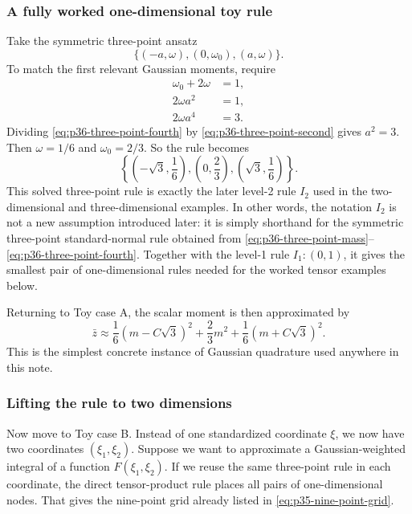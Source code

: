 \documentclass[11pt]{article}
\numberwithin{equation}{section}
\begin{document}
\subsubsection{A fully worked one-dimensional toy rule}

Take the symmetric three-point ansatz
\begin{equation}
  \{(-a,\omega),(0,\omega_0),(a,\omega)\}.
  \label{eq:p36-three-point-ansatz}
\end{equation}
To match the first relevant Gaussian moments, require
\begin{align}
  \omega_0+2\omega &= 1,
  \label{eq:p36-three-point-mass}\\
  2\omega a^2 &= 1,
  \label{eq:p36-three-point-second}\\
  2\omega a^4 &= 3.
  \label{eq:p36-three-point-fourth}
\end{align}
Dividing \eqref{eq:p36-three-point-fourth} by
\eqref{eq:p36-three-point-second} gives \(a^2=3\).  Then
\(\omega=1/6\) and \(\omega_0=2/3\).  So the rule becomes
\begin{equation}
  \left\{\left(-\sqrt3,\frac16\right),\left(0,\frac23\right),
  \left(\sqrt3,\frac16\right)\right\}.
  \label{eq:p36-three-point-rule}
\end{equation}
This solved three-point rule is exactly the later level-2 rule \(I_2\) used in
the two-dimensional and three-dimensional examples.  In other words, the notation
\(I_2\) is not a new assumption introduced later: it is simply shorthand for the
symmetric three-point standard-normal rule obtained from
\eqref{eq:p36-three-point-mass}--\eqref{eq:p36-three-point-fourth}.  Together
with the level-1 rule \(I_1:(0,1)\), it gives the smallest pair of
one-dimensional rules needed for the worked tensor examples below.

Returning to Toy case A, the scalar moment is then approximated by
\begin{equation}
  \bar z
  \approx
  \frac16(m-C\sqrt3)^2 + \frac23 m^2 + \frac16(m+C\sqrt3)^2.
  \label{eq:p36-scalar-three-point-approx}
\end{equation}
This is the simplest concrete instance of Gaussian quadrature used anywhere in
this note.

\subsubsection{Lifting the rule to two dimensions}

Now move to Toy case B.  Instead of one standardized coordinate \(\xi\), we now
have two coordinates \((\xi_1,\xi_2)\).  Suppose we want to approximate a
Gaussian-weighted integral of a function \(F(\xi_1,\xi_2)\).  If we reuse the same
three-point rule in each coordinate, the direct tensor-product rule places all
pairs of one-dimensional nodes.  That gives the nine-point grid already listed in
\eqref{eq:p35-nine-point-grid}.
\end{document}
